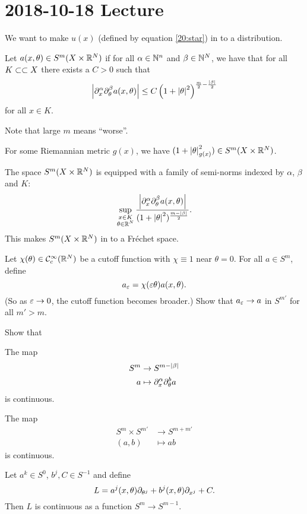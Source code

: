 \section{2018-10-18 Lecture}

We want to make $u(x)$ (defined by equation \ref{20:star}) in to a distribution.

\begin{defn}
  Let $a(x,\theta)\in S^m(X\times\mathbb{R}^N)$ if for all $\alpha\in\mathbb{N}^n$ and $\beta\in\mathbb{N}^N$, we have that for all $K\subset\subset X$ there exists a $C>0$ such that 
  \[ \left\lvert \partial_x^\alpha\partial_\theta^\beta a(x,\theta) \right\rvert \leq C\left( 1+\left\lvert \theta \right\rvert^2 \right)^{\frac m2-\frac{\left\lvert \beta \right\rvert}2} \]
  for all $x\in K$.
\end{defn}

Note that large $m$ means ``worse''.

\begin{exam}
  For some Riemannian metric $g(x)$, we have $(1+\left\lvert \theta \right\rvert^2_{g(x)}) \in S^m(X\times\mathbb{R}^N)$.
\end{exam}

The space $S^m(X\times\mathbb{R}^N)$ is equipped with a family of semi-norms indexed by $\alpha$, $\beta$ and $K$:
\[ \sup_{\substack{x\in K \\ \theta\in\mathbb{R}^N}} \frac{\left\lvert \partial_x^\alpha\partial_\theta^\beta a(x,\theta) \right\rvert}{(1+\left\lvert \theta \right\rvert^2)^\frac{m-\left\lvert \beta \right\rvert}2}. \]
This makes $S^m(X\times\mathbb{R}^N)$ in to a Fr\'echet space.

\begin{exer}
  Let $\chi(\theta)\in\mathcal{C}_c^\infty(\mathbb{R}^N)$ be a cutoff function with $\chi\equiv1$ near $\theta=0$.
  For all $a\in S^m$, define
  \[ a_\varepsilon=\chi(\varepsilon\theta)a(x,\theta). \]
  (So as $\varepsilon\to0$, the cutoff function becomes broader.)
  Show that $a_\varepsilon\to a$ in $S^{m'}$ for all $m'>m$.
\end{exer}

\begin{exer}
  Show that
  \begin{enum}
    \io The map
    \begin{align*}
      S^m &\to S^{m-\left\lvert \beta \right\rvert} \\
      a&\mapsto\partial_x^\alpha\partial_\theta^b a
    \end{align*}
    is continuous. 
    
    \io The map
    \begin{align*}
      S^m\times S^{m'} &\to S^{m+m'} \\
      (a,b)&\mapsto ab
    \end{align*}
    is continuous.

    \io Let $a^k\in S^0$, $b^j,C\in S^{-1}$ and define
    \[ L = a^j(x,\theta)\partial_{\theta^j} + b^j(x,\theta)\partial_{x^j} + C. \]
    Then $L$ is continuous as a function $S^m \to S^{m-1}$.
  \end{enum}
\end{exer}

